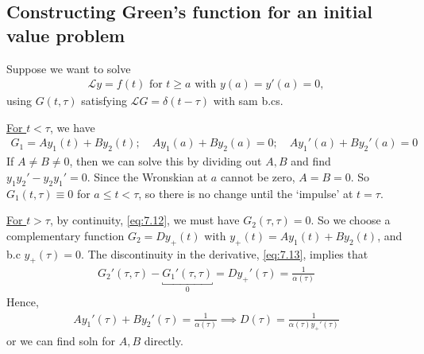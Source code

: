 \subsection{Constructing Green's function for an initial value problem}
Suppose we want to solve 
\begin{align} \label{eq:7.24}
	\mathcal L y = f(t) \text{ for } t \geq a \text{ with } y(a) = y'(a) = 0,
\end{align}
using $G(t, \tau)$ satisfying $\mathcal L G = \delta(t - \tau)$ with sam b.cs.

\underline{For $t < \tau$}, we have
\begin{align*}
	G_1 = A y_1(t) + B y_2(t);\quad A y_1(a) + B y_2(a) = 0;\quad A y_1'(a) + B y_2'(a) = 0
\end{align*}
If $A \neq B \neq 0$, then we can solve this by dividing out $A, B$ and find $y_1 y_2' - y_2 y_1' = 0$.
Since the Wronskian at $a$ cannot be zero, $A = B = 0$.
So $G_1(t,\tau) \equiv 0$ for $a \leq t < \tau$, so there is no change until the `impulse' at $t = \tau$.

\underline{For $t > \tau$}, by continuity, \cref{eq:7.12}, we must have $G_2(\tau, \tau) = 0$.
So we choose a complementary function $G_2 = D y_+(t)$ with $y_+(t) = A y_1(t) + B y_2(t)$, and b.c $y_+(\tau) = 0$.
The discontinuity in the derivative, \cref{eq:7.13}, implies that
\begin{align*}
	G_2'(\tau, \tau) - \underbracket{G_1'(\tau, \tau)}_0 = Dy_+'(\tau) = \frac{1}{\alpha(\tau)}
\end{align*}
Hence,
\begin{align*}
	A y_1'(\tau) + B y_2'(\tau) = \frac{1}{\alpha(\tau)} \implies D(\tau) = \frac{1}{\alpha(\tau) y_+'(\tau)}
\end{align*}
or we can find soln for $A, B$ directly.

